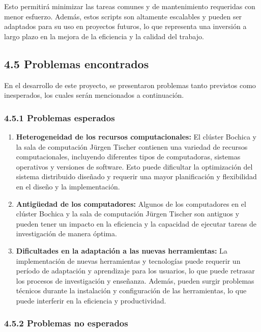 \begin{spacing}{1.5}
    Esto permitirá minimizar las tareas comunes y de mantenimiento requeridas con menor esfuerzo. Además, estos scripts son altamente escalables y pueden ser adaptados para su uso en proyectos futuros, lo que representa una inversión a largo plazo en la mejora de la eficiencia y la calidad del trabajo.

\subsection{4.5 Problemas encontrados}
En el desarrollo de este proyecto, se presentaron problemas tanto previstos como inesperados, los cuales serán mencionados a continuación.

\subsubsection{4.5.1 Problemas esperados}

\begin{enumerate}
    \item \textbf{Heterogeneidad de los recursos computacionales:} El clúster Bochica y la sala de computación Jürgen Tischer contienen una variedad de recursos computacionales, incluyendo diferentes tipos de computadoras, sistemas operativos y versiones de software. Esto puede dificultar la optimización del sistema distribuido diseñado y requerir una mayor planificación y flexibilidad en el diseño y la implementación.
    \item \textbf{Antigüedad de los computadores:} Algunos de los computadores en el clúster Bochica y la sala de computación Jürgen Tischer son antiguos y pueden tener un impacto en la eficiencia y la capacidad de ejecutar tareas de investigación de manera óptima.
    \item \textbf{Dificultades en la adaptación a las nuevas herramientas:} La implementación de nuevas herramientas y tecnologías puede requerir un período de adaptación y aprendizaje para los usuarios, lo que puede retrasar los procesos de investigación y enseñanza. Además, pueden surgir problemas técnicos durante la instalación y configuración de las herramientas, lo que puede interferir en la eficiencia y productividad.
\end{enumerate}

    \subsubsection{4.5.2 Problemas no esperados}


\end{spacing}
